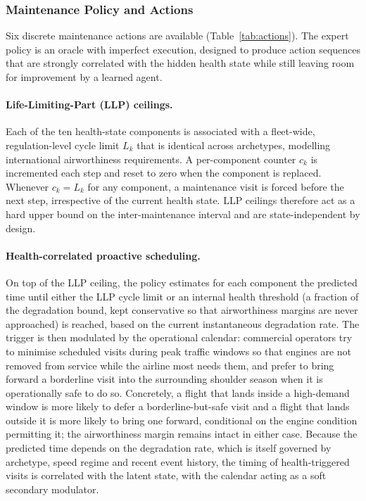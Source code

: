 \subsubsection{Maintenance Policy and Actions}
\label{sec:dataset_maintenance}

Six discrete maintenance actions are available
(Table~\ref{tab:actions}). The expert policy is an oracle with
imperfect execution, designed to produce action sequences that are
strongly correlated with the hidden health state while still leaving
room for improvement by a learned agent.

\paragraph{Life-Limiting-Part (LLP) ceilings.}
Each of the ten health-state components is associated with a
fleet-wide, regulation-level cycle limit $L_k$ that is identical across
archetypes, modelling international airworthiness requirements.
A per-component counter $c_k$ is incremented each step and reset to
zero when the component is replaced. Whenever $c_k = L_k$ for any
component, a maintenance visit is forced before the next step,
irrespective of the current health state. LLP ceilings therefore act
as a hard upper bound on the inter-maintenance interval and are
state-independent by design.

\paragraph{Health-correlated proactive scheduling.}
On top of the LLP ceiling, the policy estimates for each component the
predicted time until either the LLP cycle limit or an internal health
threshold (a fraction of the degradation bound, kept conservative so
that airworthiness margins are never approached) is reached, based on
the current instantaneous degradation rate. The trigger is then
modulated by the operational calendar: commercial operators try to
minimise scheduled visits during peak traffic windows so that engines
are not removed from service while the airline most needs them, and
prefer to bring forward a borderline visit into the surrounding
shoulder season when it is operationally safe to do so. Concretely, a
flight that lands inside a high-demand window is more likely to defer
a borderline-but-safe visit and a flight that lands outside it is more
likely to bring one forward, conditional on the engine condition
permitting it; the airworthiness margin remains intact in either case.
Because the predicted time depends on the degradation rate, which is
itself governed by archetype, speed regime and recent event history,
the timing of health-triggered visits is correlated with the latent
state, with the calendar acting as a soft secondary modulator.


